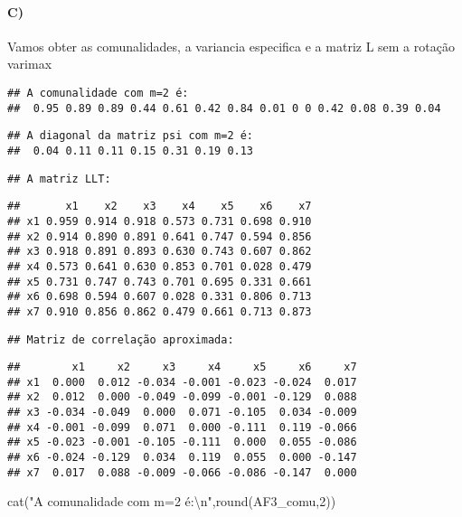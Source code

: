 \documentclass[
]{article}
\newenvironment{Shaded}{\begin{snugshade}}{\end{snugshade}}
\newcommand{\DecValTok}[1]{\textcolor[rgb]{0.00,0.00,0.81}{#1}}
\newcommand{\FunctionTok}[1]{\textcolor[rgb]{0.00,0.00,0.00}{#1}}
\newcommand{\NormalTok}[1]{#1}
\newcommand{\SpecialCharTok}[1]{\textcolor[rgb]{0.00,0.00,0.00}{#1}}
\newcommand{\StringTok}[1]{\textcolor[rgb]{0.31,0.60,0.02}{#1}}
\begin{document}
\hypertarget{c}{%
\paragraph{C)}\label{c}}

Vamos obter as comunalidades, a variancia especifica e a matriz L sem a
rotação varimax

\begin{verbatim}
## A comunalidade com m=2 é:
##  0.95 0.89 0.89 0.44 0.61 0.42 0.84 0.01 0 0 0.42 0.08 0.39 0.04
\end{verbatim}

\begin{verbatim}
## A diagonal da matriz psi com m=2 é:
##  0.04 0.11 0.11 0.15 0.31 0.19 0.13
\end{verbatim}

\begin{verbatim}
## A matriz LLT:
\end{verbatim}

\begin{verbatim}
##       x1    x2    x3    x4    x5    x6    x7
## x1 0.959 0.914 0.918 0.573 0.731 0.698 0.910
## x2 0.914 0.890 0.891 0.641 0.747 0.594 0.856
## x3 0.918 0.891 0.893 0.630 0.743 0.607 0.862
## x4 0.573 0.641 0.630 0.853 0.701 0.028 0.479
## x5 0.731 0.747 0.743 0.701 0.695 0.331 0.661
## x6 0.698 0.594 0.607 0.028 0.331 0.806 0.713
## x7 0.910 0.856 0.862 0.479 0.661 0.713 0.873
\end{verbatim}

\begin{verbatim}
## Matriz de correlação aproximada:
\end{verbatim}

\begin{verbatim}
##        x1     x2     x3     x4     x5     x6     x7
## x1  0.000  0.012 -0.034 -0.001 -0.023 -0.024  0.017
## x2  0.012  0.000 -0.049 -0.099 -0.001 -0.129  0.088
## x3 -0.034 -0.049  0.000  0.071 -0.105  0.034 -0.009
## x4 -0.001 -0.099  0.071  0.000 -0.111  0.119 -0.066
## x5 -0.023 -0.001 -0.105 -0.111  0.000  0.055 -0.086
## x6 -0.024 -0.129  0.034  0.119  0.055  0.000 -0.147
## x7  0.017  0.088 -0.009 -0.066 -0.086 -0.147  0.000
\end{verbatim}

\begin{Shaded}
\begin{Highlighting}[]
\FunctionTok{cat}\NormalTok{(}\StringTok{"A comunalidade com m=2 é:}\SpecialCharTok{\textbackslash{}n}\StringTok{"}\NormalTok{,}\FunctionTok{round}\NormalTok{(AF3\_comu,}\DecValTok{2}\NormalTok{))}
\end{Highlighting}
\end{Shaded}
\end{document}
